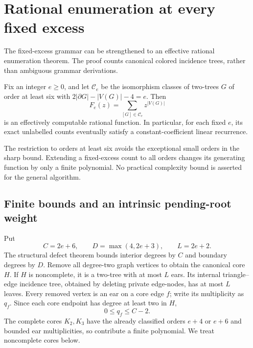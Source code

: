 \section{Rational enumeration at every fixed excess}
\label{sec:fixed-excess-rationality}

The fixed-excess grammar can be strengthened to an effective rational
enumeration theorem.  The proof counts canonical colored incidence
trees, rather than ambiguous grammar derivations.

\begin{theorem}
\label{thm:fixed-excess-rationality}
Fix an integer $e\ge0$, and let $\mathcal C_e$ be the isomorphism
classes of two-trees $G$ of order at least six with
$2|\partial G|-|V(G)|-4=e$.  Then
\[
 F_e(z)=\sum_{[G]\in\mathcal C_e}z^{|V(G)|}
\]
is an effectively computable rational function.  In particular,
for each fixed $e$, its exact unlabelled counts eventually satisfy
a constant-coefficient linear recurrence.
\end{theorem}

The restriction to orders at least six avoids the exceptional small
orders in the sharp bound.  Extending a fixed-excess count to all
orders changes its generating function by only a finite polynomial.
No practical complexity bound is asserted for the general algorithm.

\subsection{Finite bounds and an intrinsic pending-root weight}

Put
\[
 C=2e+6,\qquad D=\max(4,2e+3),\qquad L=2e+2.
\]
The structural defect theorem bounds interior degrees by $C$ and
boundary degrees by $D$.  Remove all degree-two graph vertices to
obtain the canonical core $H$.  If $H$ is noncomplete, it is a
two-tree with at most $L$ ears.  Its internal triangle--edge incidence
tree, obtained by deleting private edge-nodes, has at most $L$
leaves.  Every removed vertex is an ear on a core edge $f$; write its
multiplicity as $q_f$.  Since each core endpoint has degree at least
two in $H$,
\[
 0\le q_f\le C-2.
\]
The complete cores $K_2,K_3$ have the already classified orders
$e+4$ or $e+6$ and bounded ear multiplicities, so contribute a
finite polynomial.  We treat noncomplete cores below.

